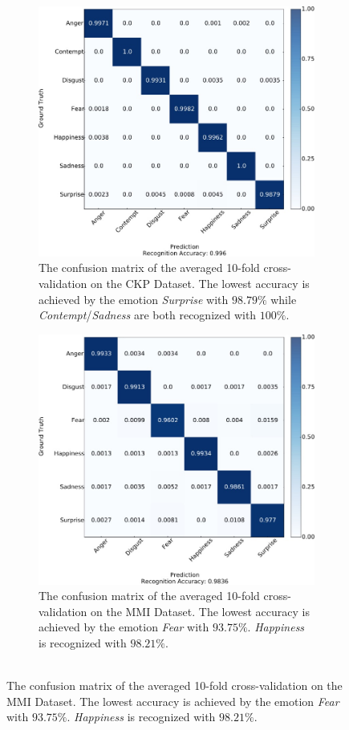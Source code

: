 \begin{figure}[ht!]
\centering
\begin{subfigure}[b]{0.46\textwidth}
\centering
\includegraphics[width=0.9\columnwidth]{Fig6}
\caption{The confusion matrix of the averaged 10-fold cross-validation on the CKP Dataset. The lowest accuracy is achieved by the emotion \textit{Surprise} with $98.79\%$ while \textit{Contempt}/\textit{Sadness} are both recognized with $100\%$.}
\label{fig:ckp_conf}
\end{subfigure}
\hspace{0.05\textwidth}
\begin{subfigure}[b]{0.46\textwidth}
\centering
\includegraphics[width=0.9\columnwidth]{Fig7}
\caption{The confusion matrix of the averaged 10-fold cross-validation on the MMI Dataset. The lowest accuracy is achieved by the emotion \textit{Fear} with $93.75\%$. \textit{Happiness} is recognized with $98.21\%$.\\~}
\label{fig:mmi_conf}
\end{subfigure}
\end{figure}


